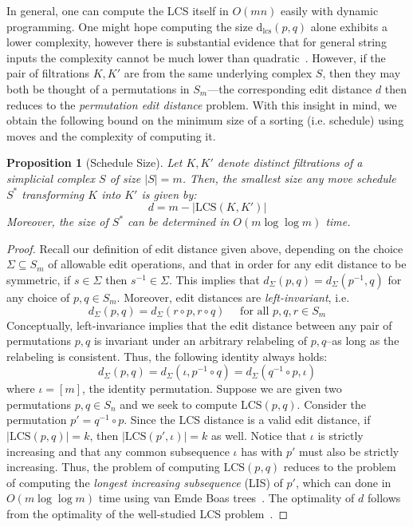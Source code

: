 \documentclass[sn-mathphys]{sn-jnl}
\newtheorem{proposition}{Proposition}
\begin{document}
%
In general, one can compute the LCS itself in $O(mn)$ easily with dynamic programming. One might hope computing the size $\mathrm{d}_{\mathrm{lcs}}(p,q)$ alone exhibits a lower complexity, however there is substantial evidence that for general string inputs the complexity cannot be much lower than quadratic~\cite{abboud2015tight}. 
However, if the pair of filtrations $K, K'$ are from the same underlying complex $S$, then they may both be thought of a permutations in $S_m$---the corresponding edit distance $d$ then reduces to the \emph{permutation edit distance} problem.
With this insight in mind, we obtain the following bound on the minimum size of a sorting (i.e. schedule) using moves and the complexity of computing it. 
\begin{proposition}[Schedule Size]\label{prop:schedule_size}
Let $K, K'$ denote distinct filtrations of a simplicial complex $S$ of size $\lvert S\rvert = m$.
Then, the smallest size any move schedule $S^*$ transforming $K$ into $K'$ is given by: 
$$ d = m - \lvert \mathrm{LCS}(K, K') \rvert $$ 
Moreover, the size of $S^\ast$ can be determined in $O(m \log \log m)$ time. 
\end{proposition}
\begin{proof} \normalsize
Recall our definition of  edit distance given above, 
depending on the choice   $\Sigma \subseteq S_m$ of allowable edit operations, and that in order for any edit distance to be symmetric, if $s \in \Sigma$ then $s^{-1} \in \Sigma$. This implies that $d_\Sigma(p,q) = d_\Sigma(p^{-1}, q)$ for any choice of  $p,q \in S_m$. 
Moreover, edit distances are \emph{left-invariant}, i.e.
\[
d_\Sigma(p,q) = d_\Sigma(r \circ p, r \circ q) \quad \text{ for all } p,q,r \in S_m
\]
Conceptually, left-invariance implies that the edit distance between any pair of permutations $p,q$ is invariant under an arbitrary relabeling of $p,q$--as long as the relabeling is consistent. Thus, the following identity always holds: 
$$ d_\Sigma(p,q) = d_\Sigma(\iota, p^{-1} \circ q) = d_\Sigma(q^{-1} \circ p, \iota) $$
where $\iota = [m]$, the identity permutation. Suppose we are given two permutations $p, q \in S_n$ and we seek to compute $\mathrm{LCS}(p, q)$. Consider the permutation $p' = q^{-1} \circ p$. Since the LCS distance is a valid edit distance, if $\lvert \mathrm{LCS}(p, q) \rvert = k$, then $\lvert \mathrm{LCS}(p', \iota) \rvert = k$ as well. Notice that $\iota$ is strictly increasing and that any common subsequence $\iota$ has with $p'$ must also be strictly increasing. Thus, the problem of computing $\mathrm{LCS}(p, q)$ reduces to the problem of computing the \emph{longest increasing subsequence} (LIS) of $p'$, which can done in $O( m \log \log m)$ time using van Emde Boas trees~\cite{bespamyatnikh2000enumerating}. The optimality of $d$ follows from the optimality of the well-studied LCS problem~\cite{kumar1987linear}. 
\end{proof}
\end{document}

